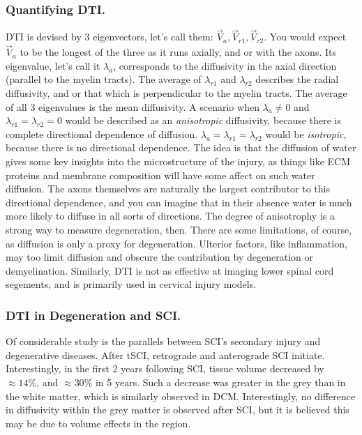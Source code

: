 \subsubsection{Quantifying DTI.}

DTI is devised by 3 eigenvectors, let's call them: $\vec{V}_{a}, \vec{V}_{r1}, \vec{V}_{r2}$. You would expect $\vec{V}_{a}$ to be the longest of the three as it runs axially, and or with the axons. Its eigenvalue, let's call it $\lambda_a$, corresponds to the diffusivity in the axial direction (parallel to the myelin tracts). The average of $\lambda_{r1}$ and $\lambda_{r2}$ describes the radial diffusivity, and or that which is perpendicular to the myelin tracts. The average of all 3 eigenvalues is the mean diffusivity. A scenario when $\lambda_a \neq 0$ and $\lambda_{r1} = \lambda_{r2} = 0$ would be described as an \textit{anisotropic} diffusivity, because there is complete directional dependence of diffusion. $\lambda_a = \lambda_{r1} = \lambda_{r2}$ would be \textit{isotropic}, because there is no directional dependence. The idea is that the diffusion of water gives some key insights into the microstructure of the injury, as things like ECM proteins and membrane composition will have some affect on such water diffusion. The axons themselves are naturally the largest contributor to this directional dependence, and you can imagine that in their absence water is much more likely to diffuse in all sorts of directions. The degree of anisotrophy is a strong way to measure degeneration, then. There are some limitations, of course, as diffusion is only a proxy for degeneration. Ulterior factors, like inflammation, may too limit diffusion and obscure the contribution by degeneration or demyelination. Similarly, DTI is not as effective at imaging lower spinal cord segements, and is primarily used in cervical injury models.

\subsubsection{DTI in Degeneration and SCI.}

Of considerable study is the parallels between SCI's secondary injury and degenerative diseases. After tSCI, retrograde and anterograde SCI initiate. Interestingly, in the first 2 years following SCI, tissue volume decreased by $\approx 14\%$, and $\approx 30\%$ in 5 years. Such a decrease was greater in the grey than in the white matter, which is similarly observed in DCM. Interestingly, no difference in diffusivity within the grey matter is observed after SCI, but it is believed this may be due to volume effects in the region.\newline

